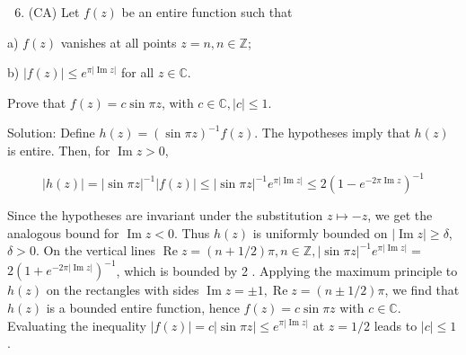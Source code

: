 \documentclass[10pt]{article}
\begin{document}
\begin{enumerate}
  \setcounter{enumi}{5}
  \item (CA) Let $f(z)$ be an entire function such that
\end{enumerate}

a) $f(z)$ vanishes at all points $z=n, n \in \mathbb{Z}$;

b) $|f(z)| \leq e^{\pi|\operatorname{Im} z|}$ for all $z \in \mathbb{C}$.

Prove that $f(z)=c \sin \pi z$, with $c \in \mathbb{C},|c| \leq 1$.

Solution: Define $h(z)=(\sin \pi z)^{-1} f(z)$. The hypotheses imply that $h(z)$ is entire. Then, for $\operatorname{Im} z>0$,

$$
|h(z)|=|\sin \pi z|^{-1}|f(z)| \leq|\sin \pi z|^{-1} e^{\pi|\operatorname{Im} z|} \leq 2\left(1-e^{-2 \pi \operatorname{Im} z}\right)^{-1}
$$

Since the hypotheses are invariant under the substitution $z \mapsto-z$, we get the analogous bound for $\operatorname{Im} z<0$. Thus $h(z)$ is uniformly bounded on $|\operatorname{Im} z| \geq \delta$, $\delta>0$. On the vertical lines $\operatorname{Re} z=(n+1 / 2) \pi, n \in \mathbb{Z},|\sin \pi z|^{-1} e^{\pi|\operatorname{Im} z|}=$ $2\left(1+e^{-2 \pi|\operatorname{Im} z|}\right)^{-1}$, which is bounded by 2 . Applying the maximum principle to $h(z)$ on the rectangles with sides $\operatorname{Im} z= \pm 1, \operatorname{Re} z=(n \pm 1 / 2) \pi$, we find that $h(z)$ is a bounded entire function, hence $f(z)=c \sin \pi z$ with $c \in \mathbb{C}$. Evaluating the inequality $|f(z)|=c|\sin \pi z| \leq e^{\pi|\operatorname{Im} z|}$ at $z=1 / 2$ leads to $|c| \leq 1$.
\end{document}
